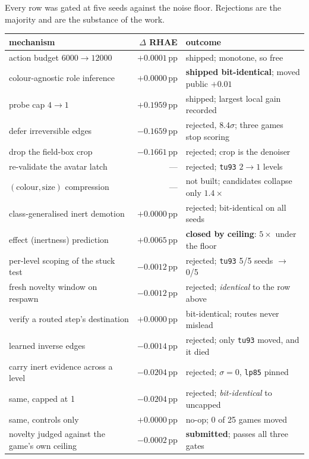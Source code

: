 \documentclass[11pt,a4paper]{article}
\newcommand{\pp}{\,\text{pp}}
\newcommand{\gain}[1]{\textcolor{green!45!black}{#1}}
\newcommand{\loss}[1]{\textcolor{red!60!black}{#1}}
\begin{document}
Every row was gated at five seeds against the noise floor. Rejections are the majority
and are the substance of the work.

\begin{center}
\begin{longtable}{p{6.4cm}rp{5.4cm}}
\toprule
mechanism & $\Delta$ RHAE & outcome \\
\midrule
\endhead
action budget $6000\to12000$ & \gain{$+0.0001\pp$} & shipped; monotone, so free \\
colour-agnostic role inference & $+0.0000\pp$ & \textbf{shipped bit-identical}; moved public $+0.01$ \\
probe cap $4\to1$ & \gain{$+0.1959\pp$} & shipped; largest local gain recorded \\
\midrule
defer irreversible edges & \loss{$-0.1659\pp$} & rejected, $8.4\sigma$; three games stop scoring \\
drop the field-box crop & \loss{$-0.1661\pp$} & rejected; crop is the denoiser \\
re-validate the avatar latch & --- & rejected; \texttt{tu93} $2\to1$ levels \\
$(\text{colour},\text{size})$ compression & --- & not built; candidates collapse only $1.4\times$ \\
class-generalised inert demotion & $+0.0000\pp$ & rejected; bit-identical on all seeds \\
effect (inertness) prediction & \gain{$+0.0065\pp$} & \textbf{closed by ceiling}: $5\times$ under the floor \\
per-level scoping of the stuck test & \loss{$-0.0012\pp$} & rejected; \texttt{tu93} 5/5 seeds $\to$ 0/5 \\
fresh novelty window on respawn & \loss{$-0.0012\pp$} & rejected; \emph{identical} to the row above \\
verify a routed step's destination & $+0.0000\pp$ & bit-identical; routes never mislead \\
learned inverse edges & \loss{$-0.0014\pp$} & rejected; only \texttt{tu93} moved, and it died \\
carry inert evidence across a level & \loss{$-0.0204\pp$} & rejected; $\sigma=0$, \texttt{lp85} pinned \\
\quad same, capped at 1 & \loss{$-0.0204\pp$} & rejected; \emph{bit-identical} to uncapped \\
\quad same, controls only & $+0.0000\pp$ & no-op; 0 of 25 games moved \\
novelty judged against the game's own ceiling & $-0.0002\pp$ & \textbf{submitted}; passes all three gates \\
\bottomrule
\end{longtable}
\end{center}
\end{document}
